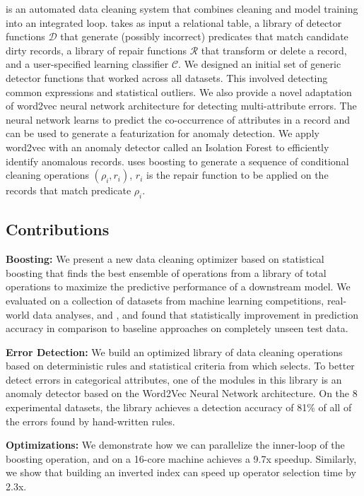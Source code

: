 \sys is an automated data cleaning system that combines cleaning and model training into an integrated loop.
\sys takes as input a relational table, a library of detector functions $\mathcal{D}$ that generate (possibly incorrect) predicates that match candidate dirty records, a library of repair functions $\mathcal{R}$ that transform or delete a record, and a user-specified learning classifier $\mathcal{C}$.
We designed an initial set of generic detector functions that worked across all datasets.
This involved detecting common expressions and statistical outliers.
We also provide a novel adaptation of \textsf{word2vec} neural network architecture for detecting multi-attribute errors.
The neural network learns to predict the co-occurrence of attributes in a record and can be used to generate a featurization for anomaly detection.
We apply \textsf{word2vec} with an anomaly detector called an Isolation Forest to efficiently identify anomalous records.
\sys uses boosting to generate a sequence of conditional cleaning operations $(\rho_i, r_i)$,  $r_i$ is the repair function to be applied on the records that match predicate $\rho_i$.

\subsection{Contributions}

\vspace{0.25em}\noindent\textbf{Boosting: } We present a new data cleaning optimizer based on statistical boosting that finds the best ensemble of operations from a library of total operations to maximize the predictive performance of a downstream model. We evaluated \sys on a collection of datasets from machine learning competitions, real-world data analyses, and \company, and found that statistically improvement in prediction accuracy in comparison to baseline approaches on completely unseen test data. 

\vspace{0.25em}\noindent\textbf{Error Detection: } We build an optimized library of data cleaning operations based on deterministic rules and statistical criteria from which \sys selects. To better detect errors in categorical attributes, one of the modules in this library is an anomaly detector based on the Word2Vec Neural Network architecture. On the 8 experimental datasets, the library achieves a detection accuracy of 81\% of all of the errors found by hand-written rules.

\vspace{0.25em}\noindent\textbf{Optimizations: } We demonstrate how we can parallelize the inner-loop of the boosting operation, and on a 16-core machine \sys achieves a 9.7x speedup. Similarly, we show that building an inverted index can speed up operator selection time by 2.3x.







